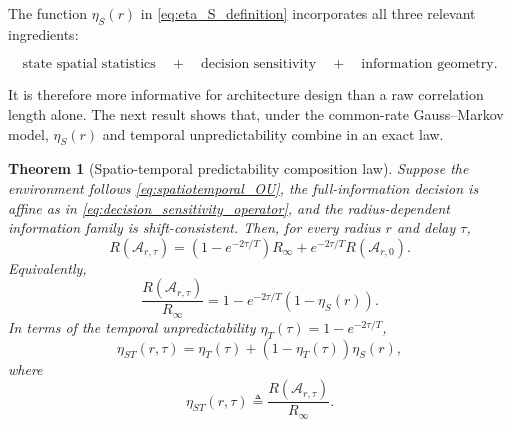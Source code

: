 \documentclass[11pt]{article}
\newtheorem{theorem}{Theorem}
\begin{document}
The function $\eta_S(r)$ in \eqref{eq:eta_S_definition} incorporates all
three relevant ingredients:

\begin{equation}
    \boxed{
    \text{state spatial statistics}
    \quad+\quad
    \text{decision sensitivity}
    \quad+\quad
    \text{information geometry}.
    }
    \label{eq:three_spatial_ingredients}
\end{equation}

It is therefore more informative for architecture design than a raw
correlation length alone. The next result shows that, under the common-rate
Gauss--Markov model, $\eta_S(r)$ and temporal unpredictability combine in an
exact law.

\begin{theorem}[Spatio-temporal predictability composition law]
\label{thm:spatiotemporal_composition}
Suppose the environment follows \eqref{eq:spatiotemporal_OU}, the
full-information decision is affine as in
\eqref{eq:decision_sensitivity_operator}, and the radius-dependent information
family is shift-consistent. Then, for every radius $r$ and delay $\tau$,
\begin{equation}
    \boxed{
    R(\mathcal{A}_{r,\tau})
    =
    \left(
        1-e^{-2\tau/T}
    \right)R_\infty
    +
    e^{-2\tau/T}
    R(\mathcal{A}_{r,0}).
    }
    \label{eq:regret_composition_unnormalized}
\end{equation}
Equivalently,
\begin{equation}
    \boxed{
    \frac{
        R(\mathcal{A}_{r,\tau})
    }{
        R_\infty
    }
    =
    1
    -
    e^{-2\tau/T}
    \left(
        1-\eta_S(r)
    \right).
    }
    \label{eq:regret_composition_normalized}
\end{equation}
In terms of the temporal unpredictability
$\eta_T(\tau)=1-e^{-2\tau/T}$,
\begin{equation}
    \boxed{
    \eta_{ST}(r,\tau)
    =
    \eta_T(\tau)
    +
    \left(
        1-\eta_T(\tau)
    \right)
    \eta_S(r),
    }
    \label{eq:eta_ST_composition}
\end{equation}
where
\[
    \eta_{ST}(r,\tau)
    \triangleq
    \frac{
        R(\mathcal{A}_{r,\tau})
    }{
        R_\infty
    }.
\]
\end{theorem}
\end{document}
